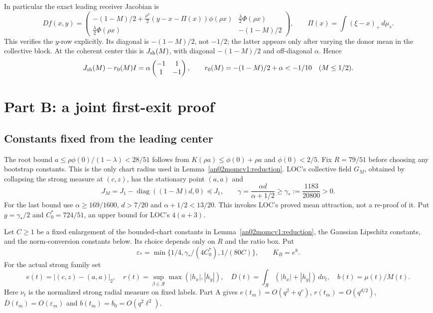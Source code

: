 \documentclass[11pt]{article}
\theoremstyle{remark}\newtheorem{remark}[theorem]{Remark}
\newcommand{\dd}{\,d}
\newcommand{\Rhalf}{\mathcal R}
\newcommand{\eps}{\varepsilon}
\begin{document}
In particular the exact leading receiver Jacobian is
\begin{equation}\label{an02momcv1:jacobian}
 Df(x,y)=
 \begin{pmatrix}
 -(1-M)/2+\frac{\rho^3}{2}(y-x-\Pi(x))\phi(\rho x)
       &\frac\lambda2\Phi(\rho x)\\
 \frac\lambda2\Phi(\rho x)&-(1-M)/2
 \end{pmatrix},
 \qquad \Pi(x)=\int(\xi-x)_+\dd\mu_s.
\end{equation}
This verifies the $y$-row explicitly. Its diagonal is
$-(1-M)/2$, not $-1/2$; the latter appears only after varying the
donor mean in the collective block. At the coherent center this
is $J_{\rm sh}(M)$, with diagonal $-(1-M)/2$ and off-diagonal
$\alpha$. Hence
\[
 J_{\rm sh}(M)-r_0(M)I=
 \alpha\begin{pmatrix}-1&1\\1&-1\end{pmatrix},\qquad
 r_0(M)=-(1-M)/2+\alpha<-1/10\quad(M\le1/2).
\]

\section{Part B: a joint first-exit proof}
\subsection{Constants fixed from the leading center}
The root bound
$a\le\rho\phi(0)/(1-\lambda)<28/51$ follows from
$K(\rho a)\le\phi(0)+\rho a$ and $\phi(0)<2/5$.
Fix $R=79/51$ before choosing any bootstrap constants.
This is the only chart radius used in Lemma~\ref{an02momcv1:reduction}.
LOC's collective field $G_M$, obtained by collapsing the strong
measure at $(c,z)$, has the stationary point $(a,a)$ and
\[
 J_M=J_1-\operatorname{diag}((1-M)d,0)\preceq J_1,\qquad
 \gamma=\frac{\alpha d}{\alpha+1/2}
 \ge\gamma_*:=\frac{1183}{20800}>0.
\]
For the last bound use $\alpha\ge169/1600$, $d>7/20$ and
$\alpha+1/2<13/20$. This invokes LOC's proved mean attraction,
not a re-proof of it. Put $g=\gamma_*/2$ and
$C_0^*=724/51$, an upper bound for LOC's $4(a+3)$.

Let $C\ge1$ be a fixed enlargement of the bounded-chart constants
in Lemma~\ref{an02momcv1:reduction}, the Gaussian Lipschitz constants,
and the norm-conversion constants below. Its choice depends only
on $R$ and the ratio box. Put
\begin{equation}\label{an02momcv1:guards}
 \eps_*=\min\{1/4,\gamma_*/(4C_0^*),1/(80C)\},
 \qquad K_B=e^8 .
\end{equation}
For the actual strong family set
\[
 e(t)=|(c,z)-(a,a)|_2,\quad
 r(t)=\sup_{\beta\in\Rhalf}\max(|h_x|,|h_y|),\quad
 \overline D(t)=\int_{\Rhalf}(|h_x|+|h_y|)\dd\nu_t,\quad
 b(t)=\mu(t)/M(t).
\]
Here $\nu_t$ is the normalized strong radial measure on fixed labels.
Part A gives $e(t_m)=O(q^2+q^v)$, $r(t_m)=O(q^{d/2})$,
$\overline D(t_m)=O(\eps_m)$ and $b(t_m)=b_0=O(q^2\ell^2)$.
\end{document}
